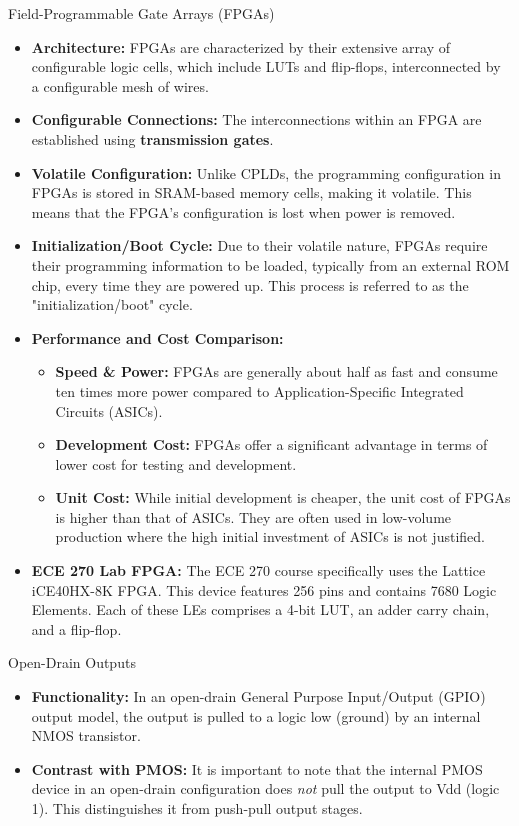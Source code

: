 \documentclass{article}
\begin{document}
Field-Programmable Gate Arrays (FPGAs)

\begin{itemize}
    \item \textbf{Architecture:} FPGAs are characterized by their extensive array of configurable logic cells, which include LUTs and flip-flops, interconnected by a configurable mesh of wires.
    \item \textbf{Configurable Connections:} The interconnections within an FPGA are established using \textbf{transmission gates}.
    \item \textbf{Volatile Configuration:} Unlike CPLDs, the programming configuration in FPGAs is stored in SRAM-based memory cells, making it volatile. This means that the FPGA's configuration is lost when power is removed.
    \item \textbf{Initialization/Boot Cycle:} Due to their volatile nature, FPGAs require their programming information to be loaded, typically from an external ROM chip, every time they are powered up. This process is referred to as the "initialization/boot" cycle.
    \item \textbf{Performance and Cost Comparison:}
    \begin{itemize}
        \item \textbf{Speed \& Power:} FPGAs are generally about half as fast and consume ten times more power compared to Application-Specific Integrated Circuits (ASICs).
        \item \textbf{Development Cost:} FPGAs offer a significant advantage in terms of lower cost for testing and development.
        \item \textbf{Unit Cost:} While initial development is cheaper, the unit cost of FPGAs is higher than that of ASICs. They are often used in low-volume production where the high initial investment of ASICs is not justified.
    \end{itemize}
    \item \textbf{ECE 270 Lab FPGA:} The ECE 270 course specifically uses the Lattice iCE40HX-8K FPGA. This device features 256 pins and contains 7680 Logic Elements. Each of these LEs comprises a 4-bit LUT, an adder carry chain, and a flip-flop.
\end{itemize}

Open-Drain Outputs

\begin{itemize}
    \item \textbf{Functionality:} In an open-drain General Purpose Input/Output (GPIO) output model, the output is pulled to a logic low (ground) by an internal NMOS transistor.
    \item \textbf{Contrast with PMOS:} It is important to note that the internal PMOS device in an open-drain configuration does \textit{not} pull the output to Vdd (logic 1). This distinguishes it from push-pull output stages.
\end{itemize}
\end{document}
